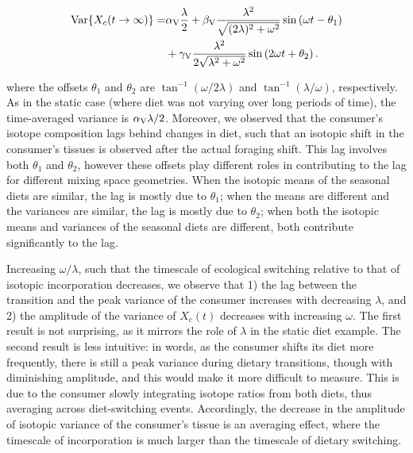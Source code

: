 \documentclass{frontiersSCNS}
\begin{document}
\begin{align}
  \label{eqXsin}
  \begin{split}
    {\rm Var}\{X_c(t \to \infty)\} = &\alpha_{\rm V}\frac{\lambda}{2} + \beta_{\rm V}\frac{\lambda^2}{\sqrt{(2\lambda)^2 + \omega^2}}\sin\left(\omega t -\theta_1\right) \\
    &+ \gamma_{\rm V}\frac{\lambda^2}{2\sqrt{\lambda^2 + \omega^2}}\sin\left(2\omega t + \theta_2\right).
  \end{split}
\end{align}

\noindent where the offsets $\theta_1$ and $\theta_2$ are $ \tan^{-1}(\omega/2\lambda)$ and $ \tan^{-1}(\lambda/\omega)$, respectively.
As in the static case (where diet was not varying over long periods of time), the time-averaged variance is $\alpha_{\rm V}\lambda/2$.
Moreover, we observed that the consumer's isotope composition lags behind changes in diet, such that an isotopic shift in the consumer's tissues is observed after the actual foraging shift.
This lag involves both $\theta_1$ and $\theta_2$, however these offsets play different roles in contributing to the lag for different mixing space geometries.
When the isotopic means of the seasonal diets are similar, the lag is mostly due to $\theta_1$; when the means are different and the variances are similar, the lag is mostly due to $\theta_2$; when both the isotopic means and variances of the seasonal diets are different, both contribute significantly to the lag.


Increasing $\omega/\lambda$, such that the timescale of ecological switching relative to that of isotopic incorporation decreases, we observe that
1) the lag between the transition and the peak variance of the consumer increases with decreasing $\lambda$, and
2) the amplitude of the variance of $X_c(t)$ decreases with increasing $\omega$.
The first result is not surprising, as it mirrors the role of $\lambda$ in the static diet example. %
The second result is less intuitive: in words, as the consumer shifts its diet more frequently, there is still a peak variance during dietary transitions, though with diminishing amplitude, and this would make it more difficult to measure.
This is due to the consumer slowly integrating isotope ratios from both diets, thus averaging across diet-switching events.
Accordingly, the decrease in the amplitude of isotopic variance of the consumer's tissue is an averaging effect, where the timescale of incorporation is much larger than the timescale of dietary switching.
\end{document}
